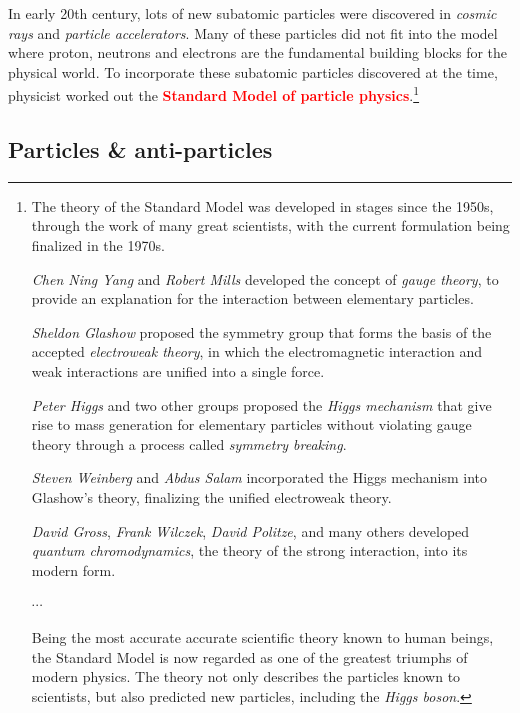 \documentclass[a4paper,12pt]{book}
\newcommand{\keypoint}[1]{\textbf{\textcolor{red}{#1}}}
\newcommand{\keypoint}[1]{\textbf{\textcolor{red}{#1}}}
\begin{document}
In early 20th century, lots of new subatomic particles were discovered in \emph{cosmic rays} and \emph{particle accelerators}. Many of these particles did not fit into the model where proton, neutrons and electrons are the fundamental building blocks for the physical world. To incorporate these subatomic particles discovered at the time, physicist worked out the \keypoint{Standard Model of particle physics}.\footnote[][-3cm]{The theory of the Standard Model was developed in stages since the 1950s, through the work of many great scientists, with the current formulation being finalized in the 1970s.
	\begin{compactitem}
		\item[--] \emph{Chen Ning Yang} and \emph{Robert Mills} developed the concept of \emph{gauge theory}, to provide an explanation for the interaction between elementary particles.
		
		\item[--] \emph{Sheldon Glashow} proposed the symmetry group that forms the basis of the accepted \emph{electroweak theory}, in which the electromagnetic interaction and weak interactions are unified into a single force.
		
		\item[--] \emph{Peter Higgs} and two other groups proposed the \emph{Higgs mechanism} that give rise to mass generation for elementary particles without violating gauge theory through a process called \emph{symmetry breaking}.
		
		\item[--] \emph{Steven Weinberg} and \emph{Abdus Salam} incorporated the Higgs mechanism into Glashow's theory, finalizing the unified electroweak theory.
		
		\item[--] \emph{David Gross}, \emph{Frank Wilczek}, \emph{David Politze}, and many others developed \emph{quantum chromodynamics}, the theory of the strong interaction, into its modern form.
		
		\item[--] $\cdots$
	\end{compactitem}

Being the most accurate accurate scientific theory known to human beings, the Standard Model is now regarded as one of the greatest triumphs of modern physics. The theory not only describes the particles known to scientists, but also predicted new particles, including the \emph{Higgs boson}. }

\subsection{Particles \& anti-particles}
\end{document}
